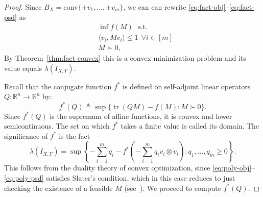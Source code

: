 \documentclass{article}
\newcommand{\R}{{\mathbb{R}}}
\newcommand{\eqdef}{\triangleq}
\DeclareMathOperator{\tr}{tr}
\begin{document}
\begin{proof}
  Since $B_X = \mathrm{conv}\{\pm v_1, \ldots, \pm v_m\}$, we can can
  rewrite \eqref{eq:fact-obj}--\eqref{eq:fact-psd} as
  \begin{align}
    &\inf f(M)\ \ \ 
    \text{s.t.}\label{eq:poly-obj}\\
    &\langle v_i, Mv_i\rangle \le 1 \ \ \forall i \in [m]\\
    &M \succ 0\label{eq:poly-psd},
  \end{align}
  By Theorem~\ref{thm:fact-convex} this is a convex minimization problem
  and its value equals $\lambda(I_{X,Y})$.

  Recall that the conjugate function $f^*$ is defined on self-adjoint
  linear operators $Q:\R^n \to \R^n$ by:
  \[
  f^*(Q) \eqdef \sup\{\tr(QM) - f(M): M \succ 0\}.
  \]
  Since $f^*(Q)$ is the supremum of affine functions, it is convex and
  lower semicontinuous. The set on which $f^*$ takes a finite value is
  called its domain. The significance of $f^*$ is the fact
  \begin{equation}\label{eq:lagrange}
  \lambda(I_{X,Y}) = 
  \sup\left\{-\sum_{i = 1}^m{q_i} - 
    f^*\left(-\sum_{i = 1}^m{q_i v_i\otimes v_i}\right):
      q_1, \ldots, q_m \ge 0\right\}.
  \end{equation}
  This follows from the duality theory of convex optimization, since
  \eqref{eq:poly-obj}--\eqref{eq:poly-psd} satisfies Slater's
  condition, which in this case reduces to just checking the existence
  of a feasible $M$ (see~\cite[Chapter 5]{BoydV04}). We proceed to
  compute $f^*(Q)$.


\end{proof}
\end{document}
